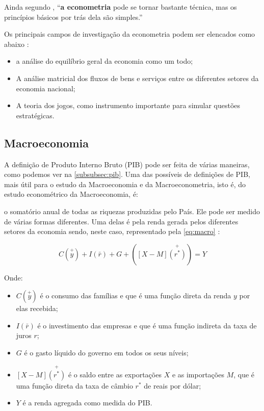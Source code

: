 \documentclass[
	10pt,				%
	openright,			%
	twoside,			%
	a5paper,			%
	english,			%
	french,				%
	spanish,			%
	brazil				%
	]{abntex2}
\renewenvironment{quote}
  {\small\list{}{\rightmargin=0.1cm \leftmargin=4cm}%
   \item\relax}
  {\endlist}
\begin{document}
Ainda segundo , ``\textbf{a econometria}
pode se tornar bastante técnica, mas os princípios básicos por trás dela
são simples.''

Os principais campos de investigação da econometria podem ser elencados
como abaixo \cite[p.~36]{rossetti}:

\begin{itemize}
\tightlist
\item
  a análise do equilíbrio geral da economia como um todo;
\item
  A análise matricial dos fluxos de bens e serviços entre os diferentes
  setores da economia nacional;
\item
  A teoria dos jogos, como instrumento importante para simular questões
  estratégicas.
\end{itemize}

\subsection{Macroeconomia}\label{macroeconomia}

A definição de Produto Interno Bruto (PIB) pode ser feita de várias
maneiras, como podemos ver na \autoref{subsubsec:pib}. Uma das possíveis
de definições de PIB, mais útil para o estudo da Macroeconomia e da
Macroeconometria, isto é, do estudo econométrico da Macroeconomia, é:

\begin{quote}
o somatório anual de todas as riquezas produzidas pelo País. Ele pode
ser medido de várias formas diferentes. Uma delas é pela renda gerada
pelos diferentes setores da economia sendo, neste caso, representado
pela \autoref{eq:macro} \cite[p.~53]{fortuna2015}:
\end{quote}

\begin{equation} \label{eq:macro}
C(\stackrel{+}{y}) + I(\bar{r}) + G + ([X - M]\stackrel{+}{(r^*)}) = Y
\end{equation}

Onde:

\begin{itemize}
\tightlist
\item
  \(C(\stackrel{+}{y})\) é o consumo das famílias e que é uma função
  direta da renda \(y\) por elas recebida;
\item
  \(I(\bar{r})\) é o investimento das empresas e que é uma função
  indireta da taxa de juros \(r\);
\item
  \(G\) é o gasto líquido do governo em todos os seus níveis;
\item
  \([X - M]\stackrel{+}{(r^*)}\) é o saldo entre as exportações \(X\) e
  as importações \(M\), que é uma função direta da taxa de câmbio
  \(r^*\) de reais por dólar;
\item
  \(Y\) é a renda agregada como medida do PIB.
\end{itemize}
\end{document}

